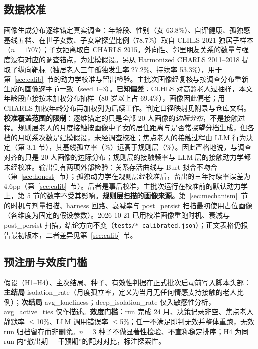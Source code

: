 \documentclass[10.5pt,twocolumn]{ctexart}
\begin{document}
\subsection{数据校准}\label{sec:data}
画像生成分布逐维锚定真实调查：年龄段、性别（女 63.8\%）、自评健康、孤独感基线五档、在世子女数、子女常探望比例（78.7\%）取自 CLHLS 2021 独居子样本（$n=1707$）；子女距离取自 CHARLS 2015。外向性、邻里朋友关系的数量与强度没有对应的调查锚点，为建模假设。另从 Harmonized CHARLS 2011--2018 提取了纵向靶标（独居老人三年孤独发生率 27.2\%、持续率 53.3\%），用于第~\ref{sec:calib}~节的动力学校准与留出检验。主批次画像经复核与按调查分布重新生成的画像逐字节一致（seed 1--3）。\textbf{已知偏差}：CLHLS 对高龄老人过抽样，本文年龄段直接按未加权分布抽样（80 岁以上占 69.4\%），画像因此偏老；用 CHARLS 加权年龄分布再加权列为后续工作。判定口径映射见附录与仓库文档。\textbf{校准覆盖范围的限制}：逐维锚定的只是全部 20 人画像的\emph{边际分布}，不是接触过程。规则层老人的月度接触按画像中子女的居住距离与是否常探望分档生成，但各档的月联系次数是建模假设，未经调查校准；焦点老人的接触过程由 LLM 行为决定（第 3.1 节），其基线孤立率（\FocIvNone\%）远高于规则层（\RulIvNone\%）。因此严格地说，与调查对齐的只是 20 人画像的边际分布；规则层的接触频率与 LLM 层的接触动力学都未经校准。输出侧有两项外部检验：关系存活曲线与 Burt 拟合不吻合（第~\ref{sec:honest}~节）；孤独动力学在规则层经校准后，留出的三年持续率误差为 4.6pp（第~\ref{sec:calib}~节）。后者是事后校准，主批次运行在校准前的默认动力学上，第 5 节的数字不受其影响。\textbf{规则层扫描的画像来源。}第~\ref{sec:mechanism}~节的时机与剂量扫描、harness 回路、衰减率与 post\_persist 扫描最初使用占位画像（各维度为固定的假设参数）。2026-10-21 已用校准画像重跑时机、衰减与 post\_persist 扫描，结论方向不变（\texttt{tests/*\_calibrated.json}）；正文表格仍报告最初版本，二者差异见第~\ref{sec:calib}~节。

\subsection{预注册与效度门槛}\label{sec:prereg}
假设（H1--H4）、主次结局、种子、有效性判据在正式批次启动前写入脚本头部：
\textbf{主结局} isolation\_rate（月度孤立率，定义为当月无任何情感支持接触的老人比例）；\textbf{次结局} avg\_loneliness；deep\_isolation\_rate 仅入敏感性分析，avg\_active\_ties 仅作描述。\textbf{效度门槛}：run 完成 24 月、决策记录非空、焦点老人静默率 $\le$10\%、LLM 调用错误率 $\le$5\%；任一不满足即判无效并整体重跑，无效 run 归档留存而非删除。$n=3$ 种子不做显著性检验、不宣称稳定排序；H4 为同 run 内``撤出期 $-$ 干预期''的配对对比，标注探索性。
\end{document}
